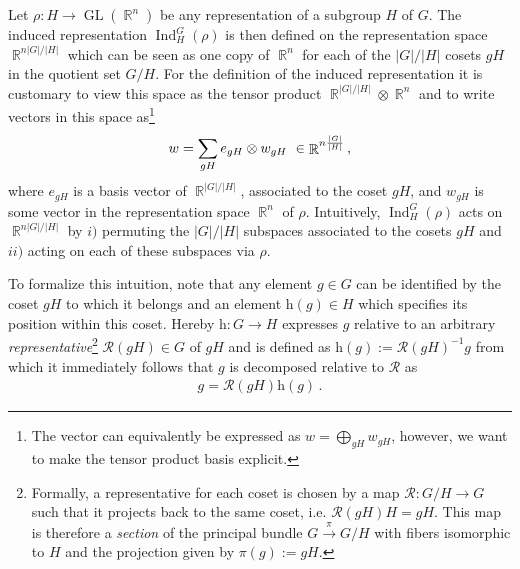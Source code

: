 \documentclass{article}
\DeclareMathOperator*{\R}{\mathbb{R}}
\newcommand{\GL}[1]{\ensuremath{\operatorname{GL}(#1)}}
\newcommand{\Ind}[2]{\ensuremath{\operatorname{Ind}_{#1}^{#2}}}
\begin{document}
Let $\rho:H\to\GL{\R^n}$ be any representation of a subgroup $H$ of $G$.
The induced representation $\Ind{H}{G}(\rho)$ is then defined on the representation space $\R^{n|G|/|H|}$ which can be seen as one copy of $\R^n$ for each of the $|G|/|H|$ cosets $gH$ in the quotient set $G/H$.
For the definition of the induced representation it is customary to view this space as the tensor product $\R^{|G|/|H|}\otimes\R^n$ and to write vectors in this space as\footnote{The vector can equivalently be expressed as $w=\bigoplus_{gH}w_{gH}$, however, we want to make the tensor product basis explicit.}
\begin{align}\label{eq:induced_vector_def}
    w = \sum_{gH} e_{gH} \otimes w_{gH} \ \in{\R}^{n{|G|\over|H|}}\,,
\end{align}
where $e_{gH}$ is a basis vector of $\R^{|G|/|H|}$, associated to the coset $gH$, and $w_{gH}$ is some vector in the representation space $\R^n$ of $\rho$.
Intuitively, $\Ind{H}{G}(\rho)$ acts on $\R^{n|G|/|H|}$ by $i)$ permuting the $|G|/|H|$ subspaces associated to the cosets $gH$ and $ii)$ acting on each of these subspaces via $\rho$.

To formalize this intuition, note that any element $g\in G$ can be identified by the coset $gH$ to which it belongs and an element $\text{h}(g)\in H$ which specifies its position within this coset.
Hereby $\text{h}:G\to H$ expresses $g$ relative to an arbitrary \textit{representative}\footnote{
    Formally, a representative for each coset is chosen by a map $\mathcal{R}:G/H\to G$ such that it projects back to the same coset, i.e. $\mathcal{R}(gH)H=gH$.
    This map is therefore a \textit{section} of the principal bundle $G\overset{\pi}{\rightarrow}G/H$ with fibers isomorphic to $H$ and the projection given by $\pi(g):=gH$.
}
$\mathcal{R}(gH)\in G$ of $gH$ and is defined as $\text{h}(g) := \mathcal{R}(gH)^{-1}g$ from which it immediately follows that $g$ is decomposed relative to $\mathcal{R}$ as
\begin{align}
\label{eq:g_decomposition_h-fct}
    g=\mathcal{R}(gH) \text{h}(g) \,.
\end{align}
\end{document}
